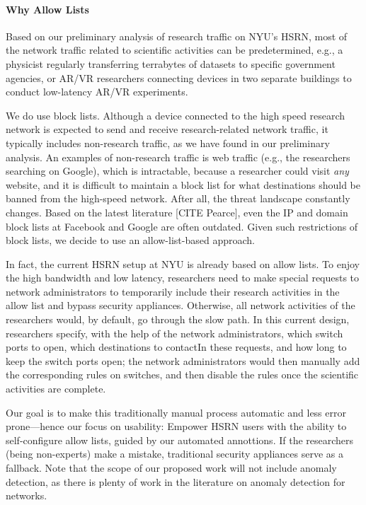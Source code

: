 \paragraph{Why Allow Lists}
Based on our preliminary analysis of research traffic on NYU's HSRN, most of the network traffic related to scientific activities can be predetermined, e.g., a physicist regularly transferring terrabytes of datasets to specific government agencies, or AR/VR researchers connecting devices in two separate buildings to conduct low-latency AR/VR experiments.

We do use block lists. Although a device connected to the high speed research network is expected to send and receive research-related network traffic, it typically includes non-research traffic, as we have found in our preliminary analysis. An examples of non-research traffic is web traffic (e.g., the researchers searching on Google), which is intractable, because a researcher could visit \textit{any} website, and it is difficult to maintain a block list for what destinations should be banned from the high-speed network. After all, the threat landscape constantly changes. Based on the latest literature [CITE Pearce], even the IP and domain block lists at Facebook and Google are often outdated. Given such restrictions of block lists, we decide to use an allow-list-based approach.

In fact, the current HSRN setup at NYU is already based on allow lists. To enjoy the high bandwidth and low latency, researchers need to make special requests to network administrators to temporarily include their research activities in the allow list and bypass security appliances. Otherwise, all network activities of the researchers would, by default, go through the slow path. In this current design, researchers specify, with the help of the network administrators, which switch ports to open, which destinations to contactIn these requests, and how long to keep the switch ports open; the network administrators would then manually add the corresponding rules on switches, and then disable the rules once the scientific activities are complete.

Our goal is to make this traditionally manual process automatic and less error prone---hence our focus on usability: Empower HSRN users with the ability to self-configure allow lists, guided by our automated annottions. If the researchers (being non-experts) make a mistake, traditional security appliances serve as a fallback. Note that the scope of our proposed work will not include anomaly detection, as there is plenty of work in the literature on anomaly detection for networks.


